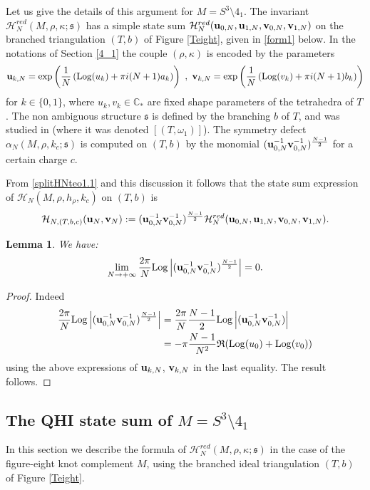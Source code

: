 \documentclass[11pt]{amsart}
\newtheorem{lem}[teo]{Lemma}
\newcommand{\mc}{\mathbb{C}}
\newcommand{\bu}{{\bf u}}
\newcommand{\bv}{{\bf v}}
\newcommand{\Log}{{\rm Log}}
\newcommand{\Hh}{{\mathcal H}}
\newcommand{\ra}{\rightarrow}
\begin{document}
{Let us give the details of this argument for $M=S^3\setminus 4_1$. The invariant $\Hh_N^{red}(M,\rho,\kappa;\mathfrak{s})$ has a simple state sum $\Hh_{N}^{red}(\bu_{0,N},\bu_{1,N},\bv_{0,N},\bv_{1,N})$ on the branched triangulation $(T,b)$ of Figure \ref{Teight}, given in \eqref{form1} below. In the notations of Section \ref{4_1} the couple $(\rho,\kappa)$ is encoded by the parameters 
$$\bu_{k,N} = \exp\left(\frac{1}{N}\left(\Log(u_k)+ \pi i (N+1)a_k\right)\right)\ ,\ \bv_{k,N} = \exp\left(\frac{1}{N}\left(\Log(v_k) + \pi i (N+1)b_k\right)\right)$$
for $k\in \{0,1\}$, where $u_k,v_k\in \mc_*$ are fixed shape parameters of the tetrahedra of $T$. The non ambiguous structure $\mathfrak{s}$ is defined by the branching $b$ of $T$, and was studied in \cite[Section 9.2]{NA} (where it was denoted $[(T,\omega_1)]$). The symmetry defect $\alpha_N(M,\rho,k_c;\mathfrak{s})$ is computed on $(T,b)$ by the monomial $(\bu_{0,N}^{-1}\bv_{0,N}^{-1})^{\frac{N-1}{2}}$ for a certain charge $c$.

From \eqref{splitHNteo1.1} and this discussion it follows that the state sum expression of $\Hh_{N}(M,\rho,h_\rho,k_c)$ on $(T,b)$ is \begin{equation}\label{ssumrednonred}
	\Hh_{N,(T,b,c)}(\bu_N,\bv_N) := (\bu_{0,N}^{-1}\bv_{0,N}^{-1})^{\frac{N-1}{2}}\Hh_{N}^{red}(\bu_{0,N},\bu_{1,N},\bv_{0,N},\bv_{1,N}).
\end{equation}

\begin{lem}\label{lem:lim:sym:defect} We have:
$$\lim_{N\ra +\infty} \dfrac{2\pi}{N}\Log \left \vert (\bu_{0,N}^{-1}\bv_{0,N}^{-1})^{\frac{N-1}{2}} \right \vert =0.$$
\end{lem}

\begin{proof} Indeed
\begin{align*}
	\dfrac{2\pi}{N}\Log \left \vert (\bu_{0,N}^{-1}\bv_{0,N}^{-1})^{\frac{N-1}{2}} \right \vert 
	&= \dfrac{2\pi}{N} \frac{N-1}{2}\Log \left \vert (\bu_{0,N}^{-1}\bv_{0,N}^{-1}) \right \vert 
	\\
	&= -\pi \frac{N-1}{N^2}\mathfrak{R}(\Log (u_{0})+\Log (v_{0}))
\end{align*}
using the above expressions of $\bu_{k,N}$, $\bv_{k,N}$ in the last equality. The result follows.\end{proof}

\subsection{The QHI state sum of $M=S^3\setminus 4_1$}\label{sec:statesum} In this section we describe the formula of $\Hh_{N}^{red}(M,\rho,\kappa; \mathfrak{s})$ in the case of the figure-eight knot complement $M$, using the branched ideal triangulation $(T,b)$ of Figure \ref{Teight}.

}
\end{document}
